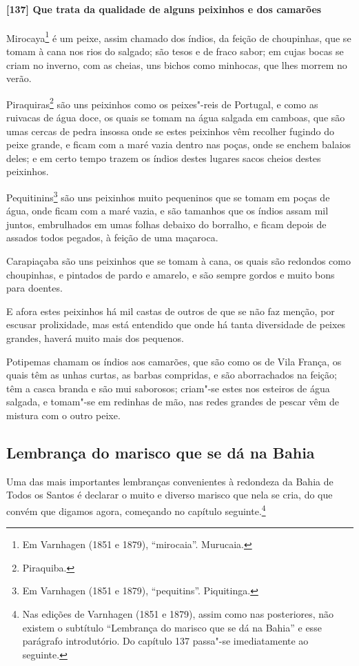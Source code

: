 \paragraph{[137] Que trata da qualidade de alguns peixinhos e dos camarões}\quad
Mirocaya\footnote{ Em Varnhagen (1851 e 1879), ``mirocaia''. Murucaia.} é um peixe, assim
chamado dos índios, da feição de choupinhas, que se tomam à cana nos rios do salgado; são
tesos e de fraco sabor; em cujas bocas se criam no inverno, com as cheias, uns bichos como
minhocas, que lhes morrem no verão.

Piraquiras\footnote{ Piraquiba.} são uns peixinhos como os peixes"-reis de Portugal, e como
as ruivacas de água doce, os quais se tomam na água salgada em camboas, que são umas
cercas de pedra insossa onde se estes peixinhos vêm recolher fugindo do peixe grande, e
ficam com a maré vazia dentro nas poças, onde se enchem balaios deles; e em certo tempo
trazem os índios destes lugares sacos cheios destes peixinhos.

Pequitinins\footnote{ Em Varnhagen (1851 e 1879), ``pequitins''. Piquitinga.} são uns
peixinhos muito pequeninos que se tomam em poças de água, onde ficam com a maré vazia, e
são tamanhos que os índios assam mil juntos, embrulhados em umas folhas debaixo do
borralho, e ficam depois de assados todos pegados, à feição de uma maçaroca.

Carapiaçaba são uns peixinhos que se tomam à cana, os quais são redondos como choupinhas,
e pintados de pardo e amarelo, e são sempre gordos e muito bons para doentes.

E afora estes peixinhos há mil castas de outros de que se não faz menção, por escusar
prolixidade, mas está entendido que onde há tanta diversidade de peixes grandes, haverá
muito mais dos pequenos.

Potipemas chamam os índios aos camarões, que são como os de Vila França, os quais têm as
unhas curtas, as barbas compridas, e são aborrachados na feição; têm a casca branda e são
mui saborosos; criam"-se estes nos esteiros de água salgada, e tomam"-se em redinhas de mão,
nas redes grandes de pescar vêm de mistura com o outro peixe.

\subsection{Lembrança do marisco que se dá na Bahia}

Uma das mais importantes lembranças convenientes à redondeza da Bahia de Todos os Santos é
declarar o muito e diverso marisco que nela se cria, do que convém que digamos agora,
começando no capítulo seguinte.\footnote{ Nas edições de Varnhagen (1851 e 1879), assim
como nas posteriores, não existem o subtítulo ``Lembrança do marisco que se dá na Bahia''
e esse parágrafo introdutório. Do capítulo 137 passa"-se imediatamente ao seguinte.}

